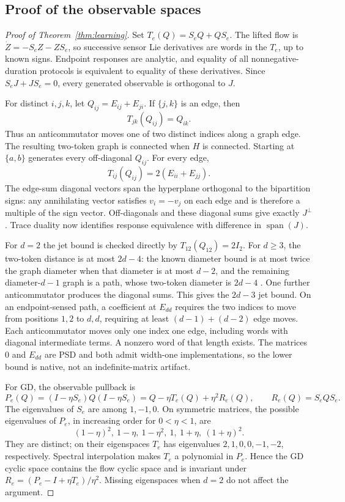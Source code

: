 \documentclass[11pt]{article}
\theoremstyle{remark}
\newcommand{\spanlin}{\operatorname{span}}
\begin{document}
\subsection{Proof of the observable spaces}

\begin{proof}[Proof of Theorem~\ref{thm:learning}]
Set $T_e(Q)=S_eQ+QS_e$. The lifted flow is $\dot Z=-S_eZ-ZS_e$, so successive sensor Lie derivatives are words in the $T_e$, up to known signs. Endpoint responses are analytic, and equality of all nonnegative-duration protocols is equivalent to equality of these derivatives. Since $S_eJ+JS_e=0$, every generated observable is orthogonal to $J$.

For distinct $i,j,k$, let $Q_{ij}=E_{ij}+E_{ji}$. If $\{j,k\}$ is an edge, then
\[
 T_{jk}(Q_{ij})=Q_{ik}.
\]
Thus an anticommutator moves one of two distinct indices along a graph edge. The resulting two-token graph is connected when $H$ is connected. Starting at $\{a,b\}$ generates every off-diagonal $Q_{ij}$. For every edge,
\[
 T_{ij}(Q_{ij})=2(E_{ii}+E_{jj}).
\]
The edge-sum diagonal vectors span the hyperplane orthogonal to the bipartition signs: any annihilating vector satisfies $v_i=-v_j$ on each edge and is therefore a multiple of the sign vector. Off-diagonals and these diagonal sums give exactly $J^\perp$. Trace duality now identifies response equivalence with difference in $\spanlin(J)$.

For $d=2$ the jet bound is checked directly by $T_{12}(Q_{12})=2I_2$. For $d\geq3$, the two-token distance is at most $2d-4$: the known diameter bound is at most twice the graph diameter when that diameter is at most $d-2$, and the remaining diameter-$d-1$ graph is a path, whose two-token diameter is $2d-4$ \cite{Token}. One further anticommutator produces the diagonal sums. This gives the $2d-3$ jet bound. On an endpoint-sensed path, a coefficient at $E_{dd}$ requires the two indices to move from positions $1,2$ to $d,d$, requiring at least $(d-1)+(d-2)$ edge moves. Each anticommutator moves only one index one edge, including words with diagonal intermediate terms. A nonzero word of that length exists. The matrices $0$ and $E_{dd}$ are PSD and both admit width-one implementations, so the lower bound is native, not an indefinite-matrix artifact.

For GD, the observable pullback is
\[
 P_e(Q)=(I-\eta S_e)Q(I-\eta S_e)
       =Q-\eta T_e(Q)+\eta^2 R_e(Q),\qquad R_e(Q)=S_eQS_e.
\]
The eigenvalues of $S_e$ are among $1,-1,0$. On symmetric matrices, the possible eigenvalues of $P_e$, in increasing order for $0<\eta<1$, are
\[
 (1-\eta)^2,\ 1-\eta,\ 1-\eta^2,\ 1,\ 1+\eta,\ (1+\eta)^2.
\]
They are distinct; on their eigenspaces $T_e$ has eigenvalues $2,1,0,0,-1,-2$, respectively. Spectral interpolation makes $T_e$ a polynomial in $P_e$. Hence the GD cyclic space contains the flow cyclic space and is invariant under $R_e=(P_e-I+\eta T_e)/\eta^2$. Missing eigenspaces when $d=2$ do not affect the argument.


\end{proof}
\end{document}
